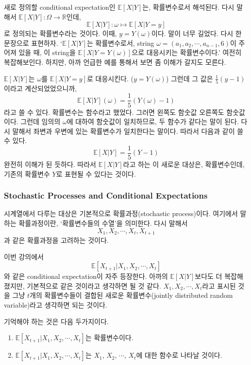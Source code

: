 \documentclass{article}
\begin{document}
새로 정의할 conditional expectation인 \(\mathbb E[X|Y]\)는, 확률변수로서 해석된다.
다시 말해서 \(\mathbb E[X|Y]:\Omega\to\mathbb R\)인데,
\[\mathbb E[X|Y]:\omega\mapsto\mathbb E[X|Y=y]\]
로 정의되는 확률변수라는 것이다.
이때, \(y=Y(\omega)\)이다.
말이 너무 길었다. 다시 한 문장으로 표현하자.
`\(\mathbb E[X|Y]\)는 확률변수로서, string \(\omega=(a_1,a_2,\cdots,a_{n-1},6)\)이 주어져 있을 때, 이 string을 \(\mathbb E[X|Y=Y(\omega)]\)으로 대응시키는 확률변수이다.'
여전히 복잡해보인다.
하지만, 아까 언급한 예를 통해서 보면 좀 이해가 갈지도 모른다.

\(\mathbb E[X|Y]\)는 \(\omega\)를 \(\mathbb E[X|Y=y]\)로 대응시킨다. (\(y=Y(\omega)\))
그런데 그 값은 \(\frac15(y-1)\)이라고 계산되었었으니까,
\[\mathbb E[X|Y](\omega)=\frac15\left(Y(\omega)-1\right)\]
라고 쓸 수 있다.
확률변수는 함수라고 했었다.
그러면 왼쪽도 함숫값 오른쪽도 함숫값이다.
그런데 임의의 \(\omega\)에 대하여 함숫값이 일치하므로, 두 함수가 같다는 말이 된다.
다시 말해서 좌변과 우변에 있는 확률변수가 일치한다는 말이다.
따라서 다음과 같이 쓸 수 있다.
\[\mathbb E[X|Y]=\frac15\left(Y-1\right)\]
완전히 이해가 된 듯하다.
따라서 \(\mathbb E[X|Y]\)라고 하는 이 새로운 대상은, 확률변수인데, 기존의 확률변수 \(Y\)로 표현될 수 있다는 것이다.

%
\subsubsection{Stochastic Processes and Conditional Expectations}
시계열에서 다루는 대상은 기본적으로 확률과정(stochastic process)이다.
여기에서 말하는 확률과정이란, `확률변수들의 수열'을 의미한다.
다시 말해서
\[X_1,X_2,\cdots,X_t,X_{t+1}\]
과 같은 확률과정을 고려하는 것이다.

이번 강의에서
\[\mathbb E[X_{t+1}|X_1,X_2,\cdots,X_t]\]
와 같은 conditional expectation이 자주 등장한다.
아까의 \(\mathbb E[X|Y]\)보다도 더 복잡해졌지만, 기본적으로 같은 것이라고 생각하면 될 것 같다.
\(X_1,X_2,\cdots,X_t\)라고 표시된 것을 그냥 \(t\)개의 확률변수들이 결합된 새로운 확률변수(jointly distributed random variable)라고 생각하면 되는 것이다.

기억해야 하는 것은 다음 두가지이다.
\begin{enumerate}[label=(\arabic*)]
\item
\(\mathbb E[X_{t+1}|X_1,X_2,\cdots,X_t]\)는 확률변수이다.
\item
\(\mathbb E[X_{t+1}|X_1,X_2,\cdots,X_t]\)는 \(X_1\), \(X_2\), \(\cdots\), \(X_t\)에 대한 함수로 나타날 것이다.
\end{enumerate}
\end{document}
